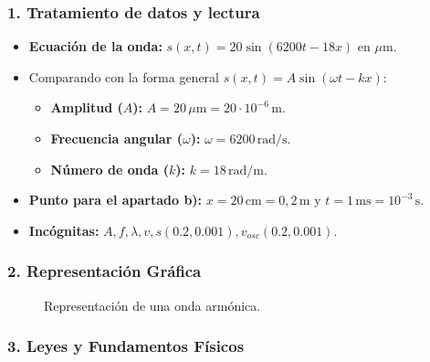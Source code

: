 \subsubsection*{1. Tratamiento de datos y lectura}
\begin{itemize}
    \item \textbf{Ecuación de la onda:} $s(x,t) = 20\sin(6200t - 18x)$ en $\mu\text{m}$.
    \item Comparando con la forma general $s(x,t) = A\sin(\omega t - kx)$:
        \begin{itemize}
            \item \textbf{Amplitud ($A$):} $A = 20 \, \mu\text{m} = 20 \cdot 10^{-6} \, \text{m}$.
            \item \textbf{Frecuencia angular ($\omega$):} $\omega = 6200 \, \text{rad/s}$.
            \item \textbf{Número de onda ($k$):} $k = 18 \, \text{rad/m}$.
        \end{itemize}
    \item \textbf{Punto para el apartado b):} $x = 20 \, \text{cm} = 0,2 \, \text{m}$ y $t = 1 \, \text{ms} = 10^{-3} \, \text{s}$.
    \item \textbf{Incógnitas:} $A, f, \lambda, v, s(0.2, 0.001), v_{osc}(0.2, 0.001)$.
\end{itemize}

\subsubsection*{2. Representación Gráfica}
\begin{figure}[H]
    \centering
    \caption{Representación de una onda armónica.}
\end{figure}

\subsubsection*{3. Leyes y Fundamentos Físicos}
